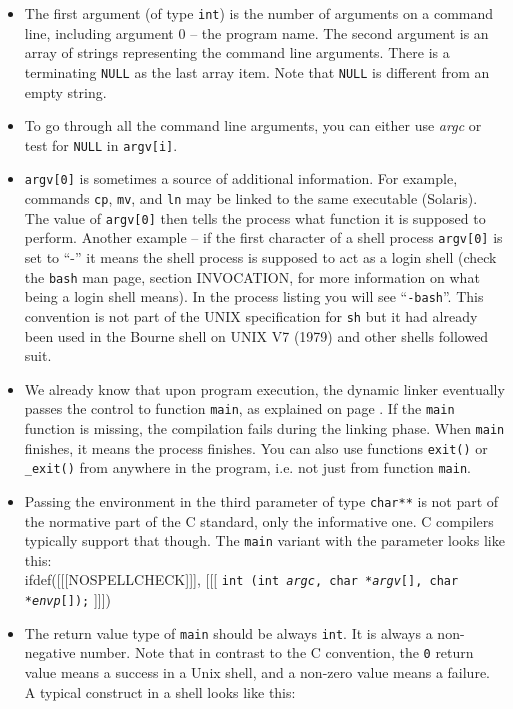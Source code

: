 \begin{itemize}
\item The first argument (of type \texttt{int}) is the number of arguments on a
command line, including argument 0 -- the program name.  The second argument is
an array of strings representing the command line arguments.  There is a
terminating \texttt{NULL} as the last array item.  Note that \texttt{NULL} is
different from an empty string.
\item To go through all the command line arguments, you can either use
\emph{argc} or test for \texttt{NULL} in \texttt{argv[i]}.
\item \label{SHELL_ARGV0} \texttt{argv[0]} is sometimes a source of additional
information.  For example, commands \texttt{cp}, \texttt{mv}, and \texttt{ln} may
be linked to the same executable (Solaris).  The value of \texttt{argv[0]} then
tells the process what function it is supposed to perform.  Another example -- if
the first character of a shell process \texttt{argv[0]} is set to ``-'' it means
the shell process is supposed to act as a login shell (check the \texttt{bash}
man page, section INVOCATION, for more information on what being a login shell
means).  In the process listing you will see ``\texttt{-bash}''.  This
convention is not part of the UNIX specification for \texttt{sh} but it had already
been used in the Bourne shell on UNIX V7 (1979) and other shells followed suit.
\item We already know that upon program execution, the dynamic linker
eventually passes the control to function \texttt{main}, as explained on page
\pageref{RUNTIMELINKER}.  If the \texttt{main} function is missing, the
compilation fails during the linking phase.  When \texttt{main} finishes, it
means the process finishes.  You can also use functions \texttt{exit()} or
\verb#_exit()# from anywhere in the program, i.e. not just from function
\texttt{main}.
\item Passing the environment in the third parameter of type
\texttt{char**} is not part of the normative part of the C standard, only the
informative one.  C compilers typically support that though.
The \texttt{main} variant with the  parameter looks like this:\\
ifdef([[[NOSPELLCHECK]]], [[[
\texttt{int (int \emph{argc}, char *\emph{argv}[],
char *\emph{envp}[]);}
]]])
\item The return value type of \texttt{main} should be always \texttt{int}.
  It is always a
non-negative number.  Note that in contrast to the C convention, the \texttt{0}
return value means a success in a Unix shell, and a non-zero value means a
failure.  A typical construct in a shell looks like this:


\end{itemize}
